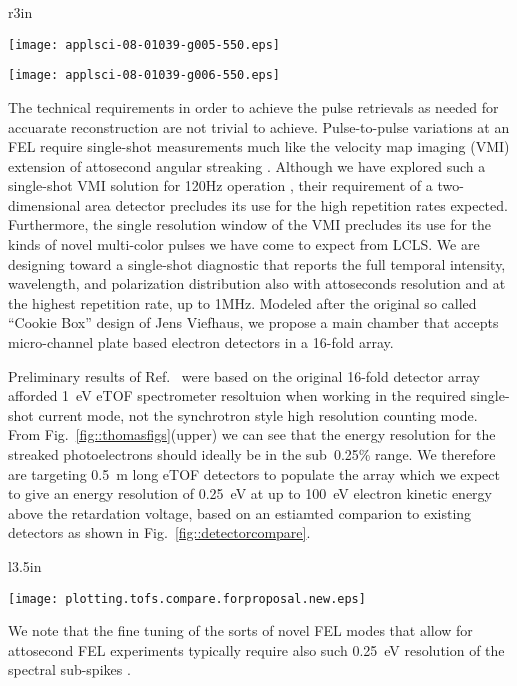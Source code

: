 \begin{wrapfigure}[26]{r}{3in}
\vspace{-3\baselineskip}
\centerline{\texttt{[image: applsci-08-01039-g005-550.eps]}}
\centerline{\texttt{[image: applsci-08-01039-g006-550.eps]}}
\vspace{-1\baselineskip}
\caption{\label{fig::thomasfigs}Reproduced from Ref.~\cite{Feurer2018}. (upper) Xray pulse retrieval error versus \% energy resolution.  
(lower) Retrieval error versus angular sampling.}
\end{wrapfigure}

The technical requirements in order to achieve the pulse retrievals as needed for accuarate reconstruction are not trivial to achieve.
Pulse-to-pulse variations at an FEL require single-shot measurements much like the velocity map imaging (VMI) \cite{VrakkingRSI} extension of attosecond angular streaking \cite{attoclockVMI2013}.
Although we have explored such a single-shot VMI solution for 120Hz operation \cite{Siqi2018}, their requirement of a two-dimensional area detector precludes its use for the high repetition rates expected. 
Furthermore, the single resolution window of the VMI precludes its use for the kinds of novel multi-color pulses we have come to expect from LCLS.
We are designing toward a single-shot diagnostic that reports the full temporal intensity, wavelength, and polarization distribution also with attoseconds resolution and at the highest repetition rate, up to 1MHz.  
Modeled after the original so called ``Cookie Box'' design of Jens Viefhaus, we propose a main chamber that accepts micro-channel plate based electron detectors in a 16-fold array.

Preliminary results of Ref.~\cite{Nick2018} were based on the original 16-fold detector array afforded 1~eV eTOF spectrometer resoltuion when working in the required single-shot current mode, not the synchrotron style high resolution counting mode.
From Fig.~\ref{fig::thomasfigs}(upper) we can see that the energy resolution for the streaked photoelectrons should ideally be in the sub~0.25\% range.
We therefore are targeting 0.5~m long eTOF detectors to populate the array which we expect to give an energy resolution of 0.25~eV at up to 100~eV electron kinetic energy above the retardation voltage, based on an estiamted comparion to existing detectors as shown in Fig.~\ref{fig::detectorcompare}.
\begin{wrapfigure}[17]{l}{3.5in}
\centerline{\texttt{[image: plotting.tofs.compare.forproposal.new.eps]}}
\vspace{-0.5\baselineskip}
\caption{\label{fig::detectorcompare}Detector resolution versus length comparison. }
\end{wrapfigure}
We note that the fine tuning of the sorts of novel FEL modes that allow for attosecond FEL experiments typically require also such 0.25~eV resolution of the spectral sub-spikes \cite{AlbertoPrivate}.

